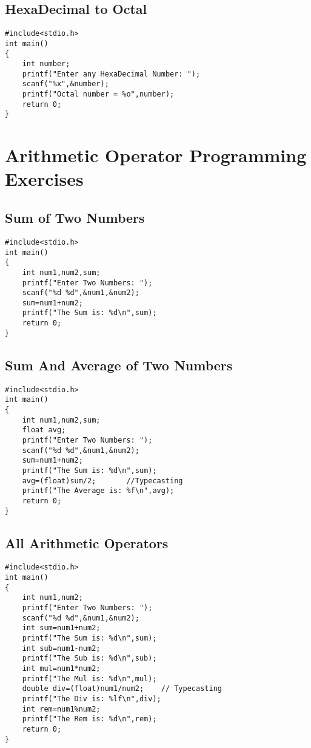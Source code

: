 \documentclass[a4paper,14pt]{article}
\begin{document}
\subsection{HexaDecimal to Octal}
\vspace{0.5cm}
\begin{lstlisting}[caption={HexaDecimal to Octal}]
#include<stdio.h>
int main()
{
    int number;
    printf("Enter any HexaDecimal Number: ");
    scanf("%x",&number);
    printf("Octal number = %o",number);
    return 0;
}
\end{lstlisting}
\newpage


\section{Arithmetic Operator Programming Exercises}


\subsection{Sum of Two Numbers}
\vspace{0.5cm}
\begin{lstlisting}[caption={Sum of Two Numbers}]
#include<stdio.h>
int main()
{
    int num1,num2,sum;
    printf("Enter Two Numbers: ");
    scanf("%d %d",&num1,&num2);
    sum=num1+num2;
    printf("The Sum is: %d\n",sum);
    return 0;
}
\end{lstlisting}
\newpage

\subsection{Sum And Average of Two Numbers}
\vspace{0.5cm}
\begin{lstlisting}[caption={Sum And Average of Two Numbers}]
#include<stdio.h>
int main()
{
    int num1,num2,sum;
    float avg;
    printf("Enter Two Numbers: ");
    scanf("%d %d",&num1,&num2);
    sum=num1+num2;
    printf("The Sum is: %d\n",sum);
    avg=(float)sum/2;		//Typecasting
    printf("The Average is: %f\n",avg);
    return 0;
}
\end{lstlisting}
\newpage

\subsection{All Arithmetic Operators}
\vspace{0.5cm}
\begin{lstlisting}[caption={All Arithmetic Operators}]
#include<stdio.h>
int main()
{
    int num1,num2;
    printf("Enter Two Numbers: ");
    scanf("%d %d",&num1,&num2);
    int sum=num1+num2;
    printf("The Sum is: %d\n",sum);
    int sub=num1-num2;
    printf("The Sub is: %d\n",sub);
    int mul=num1*num2;
    printf("The Mul is: %d\n",mul);
    double div=(float)num1/num2;	// Typecasting
    printf("The Div is: %lf\n",div);
    int rem=num1%num2;
    printf("The Rem is: %d\n",rem);
    return 0;
}
\end{lstlisting}
\newpage
\end{document}
